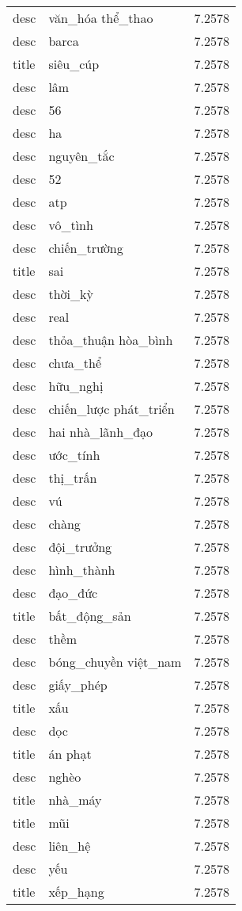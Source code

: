 \documentclass{article}
\begin{document}
\begin{tabular}{lll}
desc & văn\_hóa thể\_thao & 7.2578\\
desc & barca & 7.2578\\
title & siêu\_cúp & 7.2578\\
desc & lâm & 7.2578\\
desc & 56 & 7.2578\\
desc & ha & 7.2578\\
desc & nguyên\_tắc & 7.2578\\
desc & 52 & 7.2578\\
desc & atp & 7.2578\\
desc & vô\_tình & 7.2578\\
desc & chiến\_trường & 7.2578\\
title & sai & 7.2578\\
desc & thời\_kỳ & 7.2578\\
desc & real & 7.2578\\
desc & thỏa\_thuận hòa\_bình & 7.2578\\
desc & chưa\_thể & 7.2578\\
desc & hữu\_nghị & 7.2578\\
desc & chiến\_lược phát\_triển & 7.2578\\
desc & hai nhà\_lãnh\_đạo & 7.2578\\
desc & ước\_tính & 7.2578\\
desc & thị\_trấn & 7.2578\\
desc & vú & 7.2578\\
desc & chàng & 7.2578\\
desc & đội\_trưởng & 7.2578\\
desc & hình\_thành & 7.2578\\
desc & đạo\_đức & 7.2578\\
title & bất\_động\_sản & 7.2578\\
desc & thềm & 7.2578\\
desc & bóng\_chuyền việt\_nam & 7.2578\\
desc & giấy\_phép & 7.2578\\
title & xấu & 7.2578\\
desc & dọc & 7.2578\\
title & án phạt & 7.2578\\
desc & nghèo & 7.2578\\
title & nhà\_máy & 7.2578\\
title & mũi & 7.2578\\
desc & liên\_hệ & 7.2578\\
desc & yếu & 7.2578\\
title & xếp\_hạng & 7.2578\\

\end{tabular}
\end{document}
